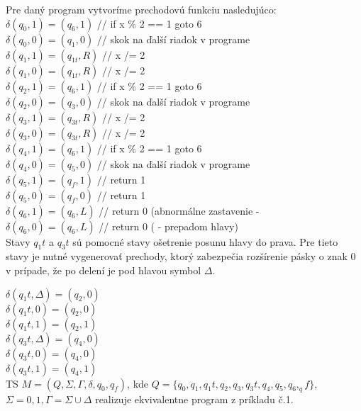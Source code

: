 \documentclass[10pt]{article}
\begin{document}
Pre daný program vytvoríme prechodovú funkciu nasledujúco: \\
    $\delta(q_0, 1) = (q_6, 1)$ // if x \% 2 == 1 goto 6  \\
    $\delta(q_0, 0) = (q_1, 0)$ // skok na ďalší riadok v programe\\
    $\delta(q_1, 1) = (q_{1t}, R)$ //  x /= 2 \\
    $\delta(q_1, 0) = (q_{1t}, R)$ //  x /= 2\\
    $\delta(q_2, 1) = (q_6, 1)$ // if x \% 2 == 1 goto 6\\
    $\delta(q_2, 0) = (q_3, 0)$ // skok na ďalší riadok v programe\\
    $\delta(q_3, 1) = (q_{3t}, R)$ //  x /= 2 \\
    $\delta(q_3, 0) = (q_{3t}, R)$ //  x /= 2\\
    $\delta(q_4, 1) = (q_6, 1)$ // if x \% 2 == 1 goto 6\\
    $\delta(q_4, 0) = (q_5, 0)$ // skok na ďalší riadok v programe\\
    $\delta(q_5, 1) = (q_f, 1)$ // return 1\\
    $\delta(q_5, 0) = (q_f, 0)$ // return 1\\
    $\delta(q_6, 1) = (q_6, L)$ // return 0 (abnormálne zastavenie -\\
    $\delta(q_6, 0) = (q_6, L)$ // return 0 ( - prepadom hlavy)\\

Stavy $q_1t$ a $q_3t$ sú pomocné stavy ošetrenie posunu hlavy do prava. Pre tieto stavy je nutné vygenerovať 
prechody, ktorý zabezpečia rozšírenie pásky o znak 0 v prípade, že po delení je pod hlavou symbol $\Delta$. 

    $\delta(q_1t, \Delta) = (q_2, 0)$ \\
    $\delta(q_1t, 0) = (q_2, 0)$ \\
    $\delta(q_1t, 1) = (q_2, 1)$ \\

    $\delta(q_3t, \Delta) = (q_4, 0)$ \\
    $\delta(q_3t, 0) = (q_4, 0)$ \\
    $\delta(q_3t, 1) = (q_4, 1)$ \\

TS $M = (Q, \Sigma, \Gamma, \delta, q_0, q_f)$, kde $Q = \{q_0, q_1,q_1t,q_2,q_3,q_3t,q_4,q_5,q_6,_qf\}$, $\Sigma = {0,1}, \Gamma = \Sigma \cup {\Delta}$ realizuje 
ekvivalentne program z príkladu č.1.
\end{document}
